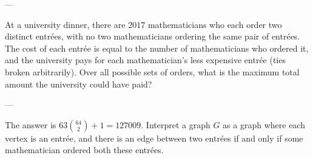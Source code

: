 
---

At a university dinner, there are $2017$ mathematicians who each order two distinct entr\'ees, with no two mathematicians ordering the same pair of entr\'ees. The cost of each entr\'ee is equal to the number of mathematicians who ordered it, and the university pays for each mathematician's less expensive entr\'ee (ties broken arbitrarily). Over all possible sets of orders, what is the maximum total amount the university could have paid?

---

The answer is $63\binom{64}2+1=127009$. Interpret a graph $G$ as a graph where each vertex is an entr\'ee, and there is an edge between two entr\'ees if and only if some mathematician ordered both these entr\'ees.

